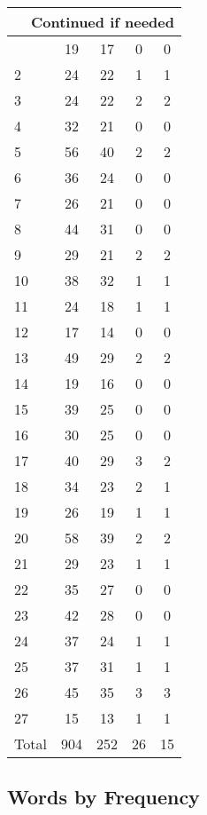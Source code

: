 \begin{center}
\begin{longtable}{l|c|c|c|c}
\hline \multicolumn{5}{|r|}{{Continued if needed}} \\ \hline
\endfoot 
1 & 19 & 17 & 0 & 0\\ \hline
2 & 24 & 22 & 1 & 1\\ \hline
3 & 24 & 22 & 2 & 2\\ \hline
4 & 32 & 21 & 0 & 0\\ \hline
5 & 56 & 40 & 2 & 2\\ \hline
6 & 36 & 24 & 0 & 0\\ \hline
7 & 26 & 21 & 0 & 0\\ \hline
8 & 44 & 31 & 0 & 0\\ \hline
9 & 29 & 21 & 2 & 2\\ \hline
10 & 38 & 32 & 1 & 1\\ \hline
11 & 24 & 18 & 1 & 1\\ \hline
12 & 17 & 14 & 0 & 0\\ \hline
13 & 49 & 29 & 2 & 2\\ \hline
14 & 19 & 16 & 0 & 0\\ \hline
15 & 39 & 25 & 0 & 0\\ \hline
16 & 30 & 25 & 0 & 0\\ \hline
17 & 40 & 29 & 3 & 2\\ \hline
18 & 34 & 23 & 2 & 1\\ \hline
19 & 26 & 19 & 1 & 1\\ \hline
20 & 58 & 39 & 2 & 2\\ \hline
21 & 29 & 23 & 1 & 1\\ \hline
22 & 35 & 27 & 0 & 0\\ \hline
23 & 42 & 28 & 0 & 0\\ \hline
24 & 37 & 24 & 1 & 1\\ \hline
25 & 37 & 31 & 1 & 1\\ \hline
26 & 45 & 35 & 3 & 3\\ \hline
27 & 15 & 13 & 1 & 1\\ \hline
\hline \hline
Total & 904 & 252 & 26 & 15



\end{longtable}
\end{center}

 
\subsection{Words by Frequency}

